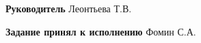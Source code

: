 \documentclass[a4paper, 12pt]{article}
\begin{document}
\vfill

\noindent \textbf{Руководитель} \hfill
\hfill \uline{\hspace{3cm}} \hspace{1.1cm} Леонтьева Т.В.

\vspace{1cm}

\noindent \textbf{Задание принял к исполнению} \hfill
\hfill \uline{\hspace{3cm}} \hspace{1.7cm} Фомин С.А.

\newpage
\tableofcontents
\end{document}
